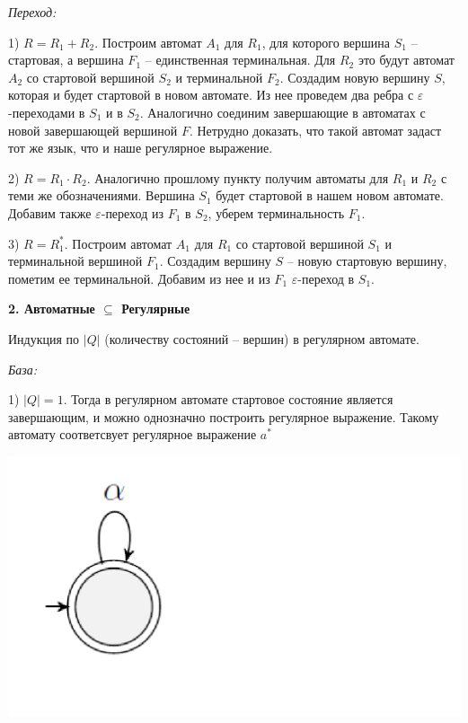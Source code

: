 \textit{Переход:}

1) $R = R_1 + R_2$. Построим автомат $A_1$ для $R_1$, для которого вершина $S_1$ -- стартовая, а вершина $F_1$ -- единственная терминальная. Для $R_2$ это будут автомат $A_2$ со стартовой вершиной $S_2$ и терминальной $F_2$.
Создадим новую вершину $S$, которая и будет стартовой в новом автомате. Из нее проведем два ребра с $\varepsilon$-переходами в $S_1$ и в $S_2$. Аналогично соединим завершающие в автоматах с новой завершающей вершиной $F$. Нетрудно доказать, что такой автомат задаст тот же язык, что и наше регулярное выражение.

2) $R = R_1 \cdot R_2$. Аналогично прошлому пункту получим автоматы для $R_1$ и $R_2$ с теми же обозначениями. Вершина $S_1$ будет стартовой в нашем новом автомате. Добавим также $\varepsilon$-переход из $F_1$ в $S_2$, уберем терминальность $F_1$.

3) $R = R_1^*$. Построим автомат $A_1$ для $R_1$ со стартовой вершиной $S_1$ и терминальной вершиной $F_1$. Создадим вершину $S$ -- новую стартовую вершину, пометим ее терминальной. Добавим из нее и из $F_1$ $\varepsilon$-переход в $S_1$.

\textbf{2. Автоматные $\subseteq$ Регулярные}



Индукция по $|Q|$ (количеству состояний -- вершин) в регулярном автомате.

\textit{База:}

1) $|Q| = 1$. Тогда в регулярном автомате стартовое состояние является завершающим, и можно однозначно построить регулярное выражение. Такому автомату соответсвует регулярное выражение $a^*$
\newline
\begin{minipage}[r]{0.1\linewidth} 
    \includegraphics[width=4\linewidth]{images/1_4_3.png}
\end{minipage} 


